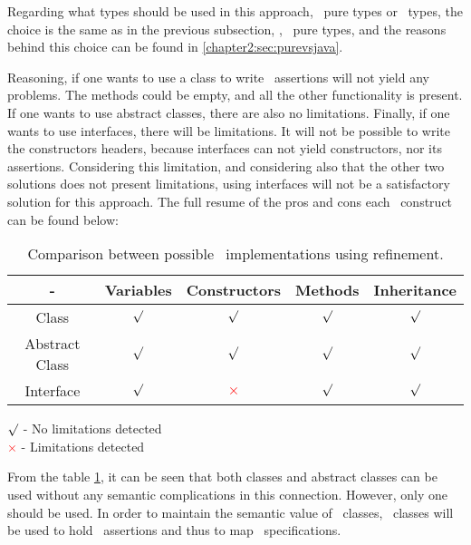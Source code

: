 Regarding what types should be used in this approach, \jml\ pure types or \java\ types, the choice is the same as in the previous subsection, \ie, \jml\ pure types, and the reasons behind this choice can be found in \ref{chapter2:sec:purevsjava}.

Reasoning, if one wants to use a class to write \jml\ assertions will not yield any problems. The methods could be empty, and all the other functionality is present.
If one wants to use abstract classes, there are also no limitations. Finally, if one wants to use interfaces, there will be limitations. It will not be possible to write the constructors headers, because interfaces can not yield constructors, nor its assertions. Considering this limitation, and considering also that the other two solutions does not present limitations, using interfaces will not be a satisfactory solution for this approach.
The full resume of the pros and cons each \java\ construct can be found below:


\begin{table}[h!t!p!]\centering
\begin{tabular}{| c | c | c | c | c |}
\hline
- & Variables & Constructors & Methods & Inheritance \\
\hline
\hline
Class & \textcolor{green}{$\surd$} & \textcolor{green}{$\surd$} & \textcolor{green}{$\surd$} & \textcolor{green}{$\surd$} \\
\hline
Abstract Class & \textcolor{green}{$\surd$} & \textcolor{green}{$\surd$} & \textcolor{green}{$\surd$} & \textcolor{green}{$\surd$}\\
\hline
Interface & \textcolor{green}{$\surd$} & \textcolor{red}{$\times$} & \textcolor{green}{$\surd$} & \textcolor{green}{$\surd$}\\
\hline
\end{tabular}
\begin{ovalenv}[2in]
\textcolor{green}{$\surd$} - No limitations detected\\
\textcolor{red}{$\times$} - Limitations detected
\end{ovalenv}
\caption{Comparison between possible \jml\ implementations using refinement.}
\label{tab:comp_c_ac_i_ref}
\end{table}

From the table \ref{tab:comp_c_ac_i_ref}, it can be seen that both classes and abstract classes can be used without any semantic complications in this connection. 
However, only one should be used. In order to maintain the semantic value of \vpp\ classes, \java\ classes will be used to hold \jml\ assertions and thus to map \vpp\ specifications.

